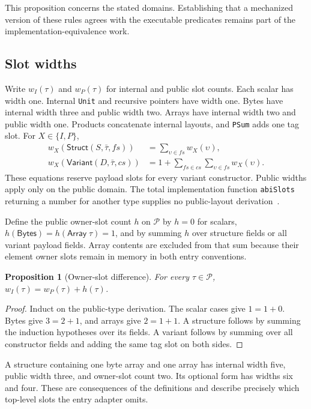 \documentclass[11pt]{article}
\newcommand{\code}[1]{\texttt{#1}}
\newcommand{\ty}[1]{\mathsf{#1}}
\newcommand{\Pp}{\mathcal{P}}
\newtheorem{proposition}[definition]{Proposition}
\begin{document}
This proposition concerns the stated domains.  Establishing that a mechanized version of these rules agrees with the executable predicates remains part of the implementation-equivalence work.

\subsection{Slot widths}

Write $w_I(\tau)$ and $w_P(\tau)$ for internal and public slot counts.  Each scalar has width one.  Internal \code{Unit} and recursive pointers have width one.  Bytes have internal width three and public width two.  Arrays have internal width two and public width one.  Products concatenate internal layouts, and \code{PSum} adds one tag slot.  For $X\in\{I,P\}$,
\begin{align*}
w_X(\ty{Struct}(S,\bar\tau,fs))&=\sum_{\upsilon\in fs}w_X(\upsilon),\\
w_X(\ty{Variant}(D,\bar\tau,cs))&=1+\sum_{fs\in cs}\sum_{\upsilon\in fs}w_X(\upsilon).
\end{align*}
These equations reserve payload slots for every variant constructor.  Public widths apply only on the public domain.  The total implementation function \code{abiSlots} returning a number for another type supplies no public-layout derivation~\cite{types}.

Define the public owner-slot count $h$ on $\Pp$ by $h=0$ for scalars, $h(\ty{Bytes})=h(\ty{Array}\;\tau)=1$, and by summing $h$ over structure fields or all variant payload fields.  Array contents are excluded from that sum because their element owner slots remain in memory in both entry conventions.

\begin{proposition}[Owner-slot difference]
For every $\tau\in\Pp$, $w_I(\tau)=w_P(\tau)+h(\tau)$.
\end{proposition}
\begin{proof}
Induct on the public-type derivation.  The scalar cases give $1=1+0$.  Bytes give $3=2+1$, and arrays give $2=1+1$.  A structure follows by summing the induction hypotheses over its fields.  A variant follows by summing over all constructor fields and adding the same tag slot on both sides.
\end{proof}

A structure containing one byte array and one array has internal width five, public width three, and owner-slot count two.  Its optional form has widths six and four.  These are consequences of the definitions and describe precisely which top-level slots the entry adapter omits.
\end{document}
